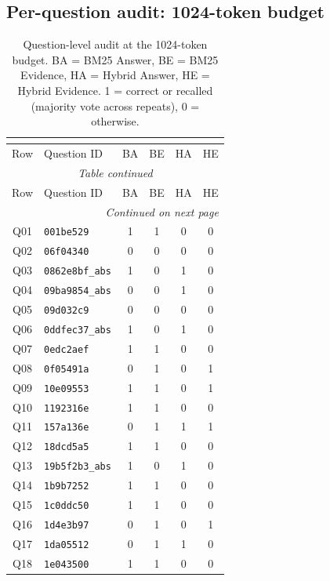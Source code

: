 \clearpage

\subsection{Per-question audit: 1024-token budget}

\begin{longtable}{@{}clcccc@{}}
\caption{Question-level audit at the 1024-token budget. BA = BM25 Answer, BE = BM25 Evidence, HA = Hybrid Answer, HE = Hybrid Evidence. 1 = correct or recalled (majority vote across repeats), 0 = otherwise.}\\
\label{tab:audit_1024}\\
\toprule
Row & Question ID & BA & BE & HA & HE \\
\midrule
\endfirsthead
\multicolumn{6}{c}{{\itshape Table \thetable{} continued}} \\[2pt]
\toprule Row & Question ID & BA & BE & HA & HE \\ \midrule
\endhead
\midrule \multicolumn{6}{r}{{\itshape Continued on next page}} \\
\endfoot
\bottomrule
\endlastfoot
Q01 & \texttt{001be529} & 1 & 1 & 0 & 0 \\
Q02 & \texttt{06f04340} & 0 & 0 & 0 & 0 \\
Q03 & \texttt{0862e8bf\_abs} & 1 & 0 & 1 & 0 \\
Q04 & \texttt{09ba9854\_abs} & 0 & 0 & 1 & 0 \\
Q05 & \texttt{09d032c9} & 0 & 0 & 0 & 0 \\
Q06 & \texttt{0ddfec37\_abs} & 1 & 0 & 1 & 0 \\
Q07 & \texttt{0edc2aef} & 1 & 1 & 0 & 0 \\
Q08 & \texttt{0f05491a} & 0 & 1 & 0 & 1 \\
Q09 & \texttt{10e09553} & 1 & 1 & 0 & 1 \\
Q10 & \texttt{1192316e} & 1 & 1 & 0 & 0 \\
Q11 & \texttt{157a136e} & 0 & 1 & 1 & 1 \\
Q12 & \texttt{18dcd5a5} & 1 & 1 & 0 & 0 \\
Q13 & \texttt{19b5f2b3\_abs} & 1 & 0 & 1 & 0 \\
Q14 & \texttt{1b9b7252} & 1 & 1 & 0 & 0 \\
Q15 & \texttt{1c0ddc50} & 1 & 1 & 0 & 0 \\
Q16 & \texttt{1d4e3b97} & 0 & 1 & 0 & 1 \\
Q17 & \texttt{1da05512} & 0 & 1 & 1 & 0 \\
Q18 & \texttt{1e043500} & 1 & 1 & 0 & 0 \\

\end{longtable}
